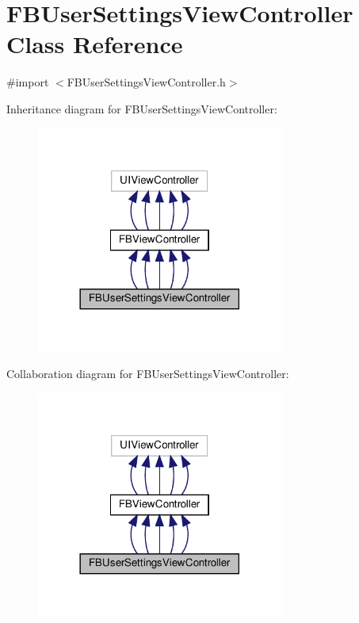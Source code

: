\hypertarget{interfaceFBUserSettingsViewController}{}\section{F\+B\+User\+Settings\+View\+Controller Class Reference}
\label{interfaceFBUserSettingsViewController}


{\ttfamily \#import $<$F\+B\+User\+Settings\+View\+Controller.\+h$>$}



Inheritance diagram for F\+B\+User\+Settings\+View\+Controller\+:
\nopagebreak
\begin{figure}[H]
\begin{center}
\leavevmode
\includegraphics[width=230pt]{interfaceFBUserSettingsViewController__inherit__graph}
\end{center}
\end{figure}


Collaboration diagram for F\+B\+User\+Settings\+View\+Controller\+:
\nopagebreak
\begin{figure}[H]
\begin{center}
\leavevmode
\includegraphics[width=230pt]{interfaceFBUserSettingsViewController__coll__graph}
\end{center}
\end{figure}
